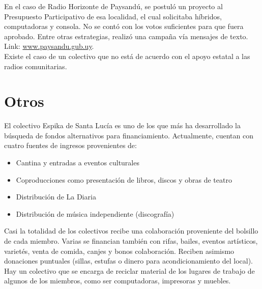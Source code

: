 En el caso de Radio Horizonte de Paysandú, se postuló un proyecto al Presupuesto Participativo de esa localidad, el cual solicitaba híbridos, computadoras y consola. No se contó con los votos suficientes para que fuera aprobado. Entre otras estrategias, realizó una campaña vía mensajes de texto.\\Link: \href{http://www.paysandu.gub.uy}{www.paysandu.gub.uy}.\\

Existe el caso de un colectivo que no está de acuerdo con el apoyo estatal a las radios comunitarias.\\

\section{Otros}
El colectivo Espika de Santa Lucía es uno de los que más ha desarrollado la búsqueda de fondos alternativos para financiamiento.
Actualmente, cuentan con cuatro fuentes de ingresos provenientes de:
\begin{itemize}
 \item Cantina y entradas a eventos culturales
 \item Coproducciones como presentación de libros, discos y obras de teatro
 \item Distribución de La Diaria
 \item Distribución de música independiente (discografía)
\end{itemize}

\indent Casi la totalidad de los colectivos recibe una colaboración proveniente del bolsillo de cada miembro. Varias se financian también con rifas, bailes, eventos artísticos, varietés, venta de comida, canjes y bonos colaboración. Reciben asimismo donaciones puntuales (sillas, estufas o dinero para acondicionamiento del local). Hay un colectivo que se encarga de reciclar material de los lugares de trabajo de algunos de los miembros, como ser computadoras, impresoras y muebles.